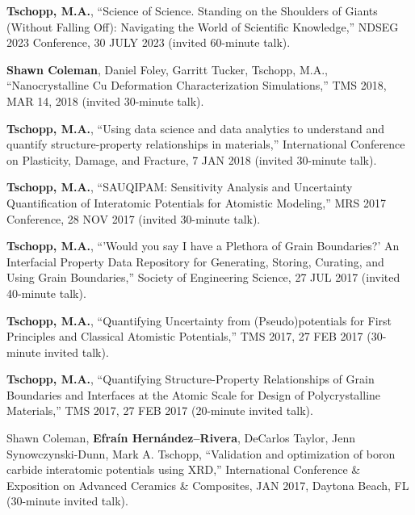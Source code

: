 \begin{cvlist}
\setlength{\itemsep}{0in}
\setlength{\parsep}{0in} 
\setlength{\parskip}{0in}
\setlength{\topsep}{0in} 
\setlength{\partopsep}{0in} 
\setlength{\leftmargin}{0.2in}

\item
\textbf{Tschopp, M.A.}, ``Science of Science. Standing on the Shoulders of Giants (Without Falling Off): Navigating the World of Scientific Knowledge,'' NDSEG 2023 Conference, 30 JULY 2023 (invited 60-minute talk).

\item
\textbf{Shawn Coleman}, Daniel Foley, Garritt Tucker, {Tschopp, M.A.}, ``Nanocrystalline Cu Deformation Characterization Simulations,''  TMS 2018, MAR 14, 2018 (invited 30-minute talk).

\item
\textbf{Tschopp, M.A.}, ``Using data science and data analytics to understand and quantify structure-property relationships in materials,'' International Conference on Plasticity, Damage, and Fracture, 7 JAN 2018 (invited 30-minute talk).

\item
\textbf{Tschopp, M.A.}, ``SAUQIPAM: Sensitivity Analysis and Uncertainty Quantification of Interatomic Potentials for Atomistic Modeling,'' MRS 2017 Conference, 28 NOV 2017 (invited 30-minute talk).

\item
\textbf{Tschopp, M.A.}, ``'Would you say I have a Plethora of Grain Boundaries?' An Interfacial Property Data Repository for Generating, Storing, Curating, and Using Grain Boundaries,'' Society of Engineering Science, 27 JUL 2017 (invited 40-minute talk).

\item
\textbf{Tschopp, M.A.}, ``Quantifying Uncertainty from (Pseudo)potentials for First Principles and Classical Atomistic Potentials,'' TMS 2017, 27 FEB 2017  (30-minute invited talk).

\item
\textbf{Tschopp, M.A.}, ``Quantifying Structure-Property Relationships of Grain Boundaries and Interfaces at the Atomic Scale for Design of Polycrystalline Materials,'' TMS 2017, 27 FEB 2017 (20-minute invited talk).

\item
Shawn Coleman, \textbf{Efra\'in Hern\'andez--Rivera}, DeCarlos Taylor, Jenn Synowczynski-Dunn, Mark A. Tschopp, ``Validation and optimization of boron carbide interatomic potentials using XRD,'' International Conference \& Exposition on Advanced Ceramics \& Composites, JAN 2017, Daytona Beach, FL (30-minute invited talk).


\end{cvlist}
